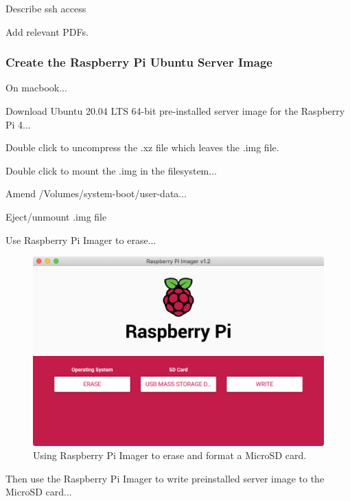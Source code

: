 \documentclass{article}
\begin{document}
Describe ssh access

Add relevant PDFs.


\subsubsection{Create the Raspberry Pi Ubuntu Server Image}

On macbook...

Download Ubuntu 20.04 LTS 64-bit pre-installed server image for the Raspberry Pi 4...

Double click to uncompress the .xz file which leaves the .img file. 

Double click to mount the .img in the filesystem...

Amend /Volumes/system-boot/user-data...

\lstset{frameround=tttt}


Eject/unmount .img file

Use Raspberry Pi Imager to erase...

\begin{figure}
	\centering	
	\includegraphics[width=1.0\textwidth]{screenshots/imager-erase.png}
	\caption{Using Raspberry Pi Imager to erase and format a MicroSD card.}
\end{figure}

Then use the Raspberry Pi Imager to write preinstalled server image to the MicroSD card...
\end{document}
